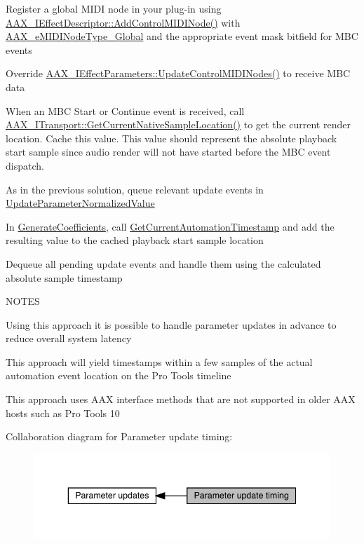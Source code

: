 \begin{DoxyEnumerate}
\item Register a global M\+I\+DI node in your plug-\/in using \mbox{\hyperlink{a01813_aa7709de005e0256feb522758ccc5b582}{A\+A\+X\+\_\+\+I\+Effect\+Descriptor\+::\+Add\+Control\+M\+I\+D\+I\+Node()}} with \mbox{\hyperlink{a00491_a5e1dffce35d05990dbbad651702678e4a2be91828f8c1dac20ab5dff136fc1fce}{A\+A\+X\+\_\+e\+M\+I\+D\+I\+Node\+Type\+\_\+\+Global}} and the appropriate event mask bitfield for M\+BC events  
\item Override \mbox{\hyperlink{a01677_ab4ec161f64086070083c21b566354861}{A\+A\+X\+\_\+\+I\+Effect\+Parameters\+::\+Update\+Control\+M\+I\+D\+I\+Nodes()}} to receive M\+BC data  
\item When an M\+BC Start or Continue event is received, call \mbox{\hyperlink{a01885_a8119233b03774528ffaa519771d792a0}{A\+A\+X\+\_\+\+I\+Transport\+::\+Get\+Current\+Native\+Sample\+Location()}} to get the current render location. Cache this value. This value should represent the absolute playback start sample since audio render will not have started before the M\+BC event dispatch.  
\item As in the previous solution, queue relevant update events in \mbox{\hyperlink{a01669_a685858711efb8634ce66c327f2865c71}{Update\+Parameter\+Normalized\+Value}}  
\item In \mbox{\hyperlink{a01669_a083265b008921b6114ede387711694b7}{Generate\+Coefficients}}, call \mbox{\hyperlink{a01789_af9ab9b228023e116f89249a56c27a20f}{Get\+Current\+Automation\+Timestamp}} and add the resulting value to the cached playback start sample location  
\item Dequeue all pending update events and handle them using the calculated absolute sample timestamp  
\end{DoxyEnumerate}

N\+O\+T\+ES \begin{DoxyItemize}
\item Using this approach it is possible to handle parameter updates in advance to reduce overall system latency \item This approach will yield timestamps within a few samples of the actual automation event location on the Pro Tools timeline \item This approach uses A\+AX interface methods that are not supported in older A\+AX hosts such as Pro Tools 10 \end{DoxyItemize}
Collaboration diagram for Parameter update timing\+:
\nopagebreak
\begin{figure}[H]
\begin{center}
\leavevmode
\includegraphics[width=343pt]{a00821}
\end{center}
\end{figure}
